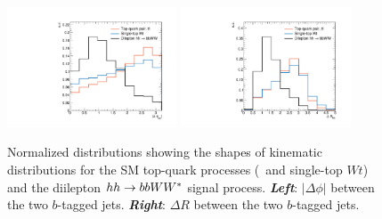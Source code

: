 \begin{figure}[!htb]
    \begin{center}
        \includegraphics[width=0.45\textwidth]{figures/search_hh/signal_pheno/shape_plots/hh_shape_plot_dphi_bb}
        \includegraphics[width=0.45\textwidth]{figures/search_hh/signal_pheno/shape_plots/hh_shape_plot_dRbb}
        \caption{
            Normalized distributions showing the shapes of kinematic distributions for the SM
            top-quark processes (\ttbar~and single-top $Wt$) and the diilepton $hh \rightarrow bbWW^*$ signal process.
            \textit{\textbf{Left}}: $|\Delta \phi|$ between the two $b$-tagged jets.
            \textit{\textbf{Right}}: $\Delta R$ between the two $b$-tagged jets.
        }
        \label{fig:hh_kin_0}
    \end{center}
\end{figure}

